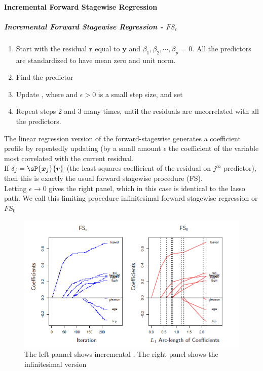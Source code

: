 \paragraph{Incremental Forward Stagewise Regression}
\subparagraph{Incremental Forward Stagewise Regression - $FS_{\epsilon}$}
\begin{enumerate}
	\item Start with the residual $\bm{r}$ equal to $\bm{y}$ and $\beta_{1}, \beta_{2}, \cdots,
		\beta_{p}$ = 0. All the predictors are standardized to have mean zero and unit norm.
	\item Find the predictor 
	\item Update , where  and $\epsilon>0$ is a small
		step size, and set 
	\item Repeat steps 2 and 3 many times, until the residuals are uncorrelated with all the
		predictors.
\end{enumerate}

The linear regression version of the forward-stagewise generates a coefficient profile by
repeatedly updating (by a small amount $\epsilon$ the coefficient of the variable most correlated
with the current residual.\\
If $\delta_{j}= \sP{\bm{x}_{j}}{\bm{r}}$ (the least squares coefficient of the residual on $j^{th}$
predictor), then this is exactly the usual forward stagewise procedure (FS).\\
Letting $\epsilon \rightarrow 0$ gives the right panel, which in this case is identical to the lasso
path. We call this limiting procedure infinitesimal forward stagewise regression or $FS_{0}$
\begin{figure}[H]
	\begin{center}
		\includegraphics[width=.7\textwidth]{chap/1chap/5sec/images/7_coefficientsFS.PNG}
	\end{center}
	\caption{The left pannel shows incremental . The right panel shows the infinitesimal version }
	\label{fig:7_coefficientsFS}
\end{figure}

